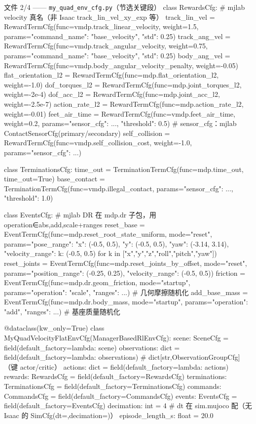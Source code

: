 \begin{codebox}[Python]{文件 2/4 —— \texttt{my\_quad\_env\_cfg.py}（节选关键段）}
class RewardsCfg:                          # mjlab velocity 真名（非 Isaac track_lin_vel_xy_exp 等）
    track_lin_vel = RewardTermCfg(func=vmdp.track_linear_velocity, weight=1.5,
        params={"command_name": "base_velocity", "std": 0.25})
    track_ang_vel = RewardTermCfg(func=vmdp.track_angular_velocity, weight=0.75,
        params={"command_name": "base_velocity", "std": 0.25})
    body_ang_vel = RewardTermCfg(func=vmdp.body_angular_velocity_penalty, weight=-0.05)
    flat_orientation_l2 = RewardTermCfg(func=mdp.flat_orientation_l2, weight=-1.0)
    dof_torques_l2 = RewardTermCfg(func=mdp.joint_torques_l2, weight=-2e-4)
    dof_acc_l2 = RewardTermCfg(func=mdp.joint_acc_l2, weight=-2.5e-7)
    action_rate_l2 = RewardTermCfg(func=mdp.action_rate_l2, weight=-0.01)
    feet_air_time = RewardTermCfg(func=vmdp.feet_air_time, weight=0.2,
        params={"sensor_cfg": ..., "threshold": 0.5})  # sensor_cfg：mjlab ContactSensorCfg(primary/secondary)
    self_collision = RewardTermCfg(func=vmdp.self_collision_cost, weight=-1.0,
        params={"sensor_cfg": ...})

class TerminationsCfg:
    time_out = TerminationTermCfg(func=mdp.time_out, time_out=True)
    base_contact = TerminationTermCfg(func=vmdp.illegal_contact,
        params={"sensor_cfg": ..., "threshold": 1.0})

class EventsCfg:                           # mjlab DR 在 mdp.dr 子包，用 operation∈{abs,add,scale}+ranges
    reset_base = EventTermCfg(func=mdp.reset_root_state_uniform, mode="reset",
        params={"pose_range": {"x": (-0.5, 0.5), "y": (-0.5, 0.5), "yaw": (-3.14, 3.14)},
                "velocity_range": {k: (-0.5, 0.5) for k in
                    ["x","y","z","roll","pitch","yaw"]}})
    reset_joints = EventTermCfg(func=mdp.reset_joints_by_offset, mode="reset",
        params={"position_range": (-0.25, 0.25), "velocity_range": (-0.5, 0.5)})
    friction = EventTermCfg(func=mdp.dr.geom_friction, mode="startup",
        params={"operation": "scale", "ranges": {...}})        # 几何摩擦随机化
    add_base_mass = EventTermCfg(func=mdp.dr.body_mass, mode="startup",
        params={"operation": "add", "ranges": {...}})          # 基座质量随机化

@dataclass(kw_only=True)
class MyQuadVelocityFlatEnvCfg(ManagerBasedRlEnvCfg):
    scene: SceneCfg = field(default_factory=lambda: scene)
    observations: dict = field(default_factory=lambda: observations)  # dict[str,ObservationGroupCfg]（键 actor/critic）
    actions: dict = field(default_factory=lambda: actions)
    rewards: RewardsCfg = field(default_factory=RewardsCfg)
    terminations: TerminationsCfg = field(default_factory=TerminationsCfg)
    commands: CommandsCfg = field(default_factory=CommandsCfg)
    events: EventsCfg = field(default_factory=EventsCfg)
    decimation: int = 4                    # dt 在 sim.mujoco 配（无 Isaac 的 SimCfg(dt=,decimation=)）
    episode_length_s: float = 20.0
\end{codebox}

